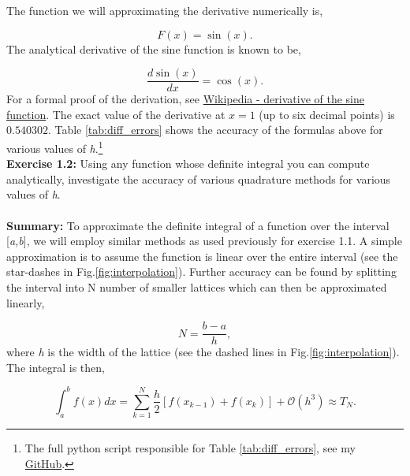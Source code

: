 \documentclass[10pt]{article}
\begin{document}
 
The function we will approximating the derivative numerically is,

\[
	F(x) = \sin(x).
\]
The analytical derivative of the sine function is known to be,

\[
	\frac{d \sin(x)}{dx} = \cos(x).
\]
For a formal proof of the derivation, see \href{https://en.wikipedia.org/wiki/Differentiation_of_trigonometric_functions#Derivative_of_the_sine_function}{Wikipedia - derivative of the sine function}. The exact value of the derivative at $x=1$ (up to six decimal points) is $0.540302$. Table \ref{tab:diff_errors} shows the accuracy of the formulas above for various values of \textit{h}.\footnote{The full python script responsible for Table \ref{tab:diff_errors}, see my \href{https://github.com/jmelahman/computational-physics-solutions/blob/master/exercises_python/Chapter\%201/exercise1_1.py}{GitHub}.} \\
\newpage \noindent
\textbf{Exercise 1.2:} Using any function whose definite integral you can compute analytically, investigate the accuracy of various quadrature methods for various values of \textit{h}. \\
\\
\textbf{Summary:}
To approximate the definite integral of a function over the interval [\textit{a,b}], we will employ similar methods as used previously for exercise 1.1. A simple approximation is to assume the function is linear over the entire interval (see the star-dashes in Fig.\ref{fig:interpolation}). Further accuracy can be found by splitting the interval into N number of smaller lattices which can then be approximated linearly,

\[
	N = \frac{b-a}{h},
\]
where \textit{h} is the width of the lattice (see the dashed lines in Fig.\ref{fig:interpolation}). The integral is then,

\begin{equation}
	\label{eq:trapezoidal}
	\int^b_a f(x)dx = \sum^N_{k=1} \frac{h}{2}[f(x_{k-1})+f(x_k)] + \mathcal{O}(h^3) \approx T_N.
\end{equation}
\end{document}
